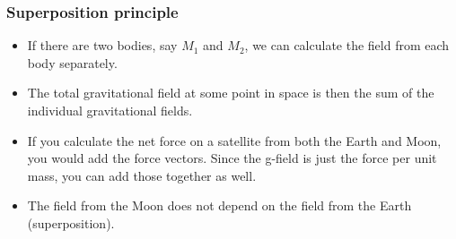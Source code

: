 \documentclass[aspectratio=169,
hyperref={colorlinks,urlcolor=blue}
]{beamer}
\begin{document}
\subsubsection{Superposition principle}
\label{subsubsec:superpositionprinciple}
{
\begin{itemize}
\item If there are two bodies, say $M_1$ and $M_2$, we can calculate the field from each body separately.
\item The total gravitational field at some point in space is then the sum of the individual gravitational fields.
\item If you calculate the net force on a satellite from both the Earth and Moon, you would add the force vectors. Since the g-field is just the force per unit mass, you can add those together as well.
\item The field from the Moon does not depend on the field from the Earth (superposition).
\end{itemize}
}
\end{document}
